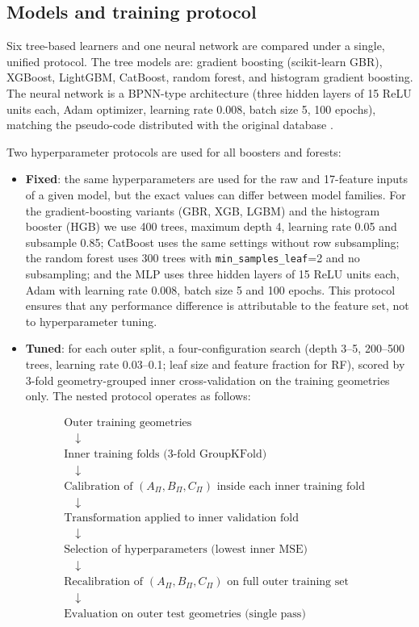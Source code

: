 \documentclass[12pt]{article}
\begin{document}
\subsection{Models and training protocol}
Six tree-based learners and one neural network are compared under a single, unified protocol. The tree models are: gradient boosting (scikit-learn GBR), XGBoost, LightGBM, CatBoost, random forest, and histogram gradient boosting. The neural network is a BPNN-type architecture (three hidden layers of 15 ReLU units each, Adam optimizer, learning rate 0.008, batch size 5, 100 epochs), matching the pseudo-code distributed with the original database \cite{bregolin}.

Two hyperparameter protocols are used for all boosters and forests:
\begin{itemize}[noitemsep]
\item \textbf{Fixed}: the same hyperparameters are used for the raw and 17-feature inputs of a given model, but the exact values can differ between model families. For the gradient-boosting variants (GBR, XGB, LGBM) and the histogram booster (HGB) we use 400 trees, maximum depth 4, learning rate 0.05 and subsample 0.85; CatBoost uses the same settings without row subsampling; the random forest uses 300 trees with \texttt{min\_samples\_leaf}=2 and no subsampling; and the MLP uses three hidden layers of 15 ReLU units each, Adam with learning rate 0.008, batch size 5 and 100 epochs. This protocol ensures that any performance difference is attributable to the feature set, not to hyperparameter tuning.
\item \textbf{Tuned}: for each outer split, a four-configuration search (depth 3--5, 200--500 trees, learning rate 0.03--0.1; leaf size and feature fraction for RF), scored by 3-fold geometry-grouped inner cross-validation on the training geometries only. The nested protocol operates as follows:
\end{itemize}

\begin{equation}
\begin{aligned}
&\text{Outer training geometries} \\
&\quad\downarrow \\
&\text{Inner training folds (3-fold GroupKFold)} \\
&\quad\downarrow \\
&\text{Calibration of } (A_\Pi, B_\Pi, C_\Pi) \text{ inside each inner training fold} \\
&\quad\downarrow \\
&\text{Transformation applied to inner validation fold} \\
&\quad\downarrow \\
&\text{Selection of hyperparameters (lowest inner MSE)} \\
&\quad\downarrow \\
&\text{Recalibration of } (A_\Pi, B_\Pi, C_\Pi) \text{ on full outer training set} \\
&\quad\downarrow \\
&\text{Evaluation on outer test geometries (single pass)}
\end{aligned}
\label{eq:nested}
\end{equation}
\end{document}
